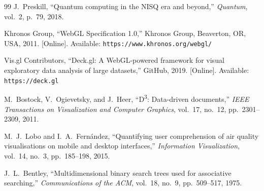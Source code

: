 \documentclass[12pt,a4paper]{article}
\begin{document}
\begin{thebibliography}{99}
J.\ Preskill,
``Quantum computing in the NISQ era and beyond,''
\emph{Quantum}, vol.\ 2, p.\ 79, 2018.

Khronos Group,
``WebGL Specification 1.0,''
Khronos Group, Beaverton, OR, USA, 2011. [Online]. Available:
\texttt{https://www.khronos.org/webgl/}

Vis.gl Contributors,
``Deck.gl: A WebGL-powered framework for visual exploratory data analysis
of large datasets,''
GitHub, 2019. [Online]. Available: \texttt{https://deck.gl}

M.\ Bostock, V.\ Ogievetsky, and J.\ Heer,
``D\textsuperscript{3}: Data-driven documents,''
\emph{IEEE Transactions on Visualization and Computer Graphics},
vol.\ 17, no.\ 12, pp.\ 2301--2309, 2011.

M.\ J.\ Lobo and I.\ A.\ Fern{\'a}ndez,
``Quantifying user comprehension of air quality visualisations on
mobile and desktop interfaces,''
\emph{Information Visualization}, vol.\ 14, no.\ 3, pp.\ 185--198, 2015.

J.\ L.\ Bentley,
``Multidimensional binary search trees used for associative searching,''
\emph{Communications of the ACM}, vol.\ 18, no.\ 9, pp.\ 509--517, 1975.

\end{thebibliography}
\end{document}
